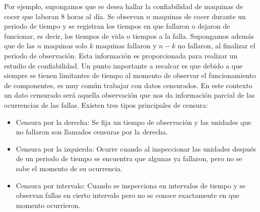 \noindent Por ejemplo, supongamos que se desea hallar la confiabilidad de  maquinas de cocer que laboran 8 horas al d\'ia. Se  observan $n$ maquinas de cocer durante un periodo de tiempo y se registran los tiempos en que fallaron o dejaron de funcionar, es decir, los tiempos de vida o 
 tiempos a la falla. Supongamos adem\'as que de las  $n$ maquinas solo $k$   maquinas fallaron y $n-k$ no fallaron, al finalizar el periodo de observaci\'on. Esta informaci\'on es proporcionada para realizar un estudio de confiabilidad. Un punto importante a recalcar es que debido a que siempre se tienen limitantes de tiempo al momento de observar el funcionamiento de componentes, es muy com\'un trabajar con datos censurados. En este contexto un dato censurado ser\'a aquella observaci\'on que nos da informaci\'on parcial de las ocurrencias de las fallas. Existen tres tipos principales de censura:
\begin{itemize}
\item Censura por la derecha: Se fija un tiempo de observaci\'on y las unidades que no fallaron son llamados censuras por la derecha.

\item Censura por la izquierda: Ocurre cuando al inspeccionar las unidades despu\'es de un periodo de tiempo se encuentra que algunas ya fallaron, pero no se sabe el momento de su ocurrencia.
\item Censura por intervalo: Cuando se inspecciona en intervalos de tiempo y se observan fallas en cierto intervalo pero no se conoce exactamente en que momento ocurrieron.
\end{itemize}



